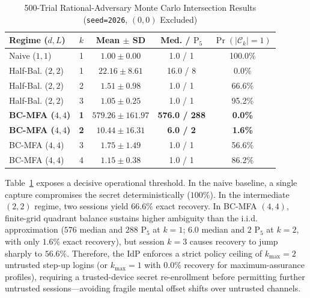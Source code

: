 \begin{table}[!t]
\caption{500-Trial Rational-Adversary Monte Carlo Intersection Results (\texttt{seed=2026}, $(0,0)$ Excluded)}
\label{tab:mc_results}
\centering
\scriptsize
\setlength{\tabcolsep}{3.5pt}
\begin{tabular}{@{}lcccc@{}}
\toprule
\textbf{Regime ($d, L$)} & \textbf{$k$} & \textbf{Mean $\pm$ SD} & \textbf{Med. / $\text{P}_5$} & \textbf{$\Pr(|\mathcal{C}_k|{=}1)$} \\
\midrule
Naive ($1, 1$) & 1 & $1.00 \pm 0.00$ & 1.0 / 1 & 100.0\% \\
\midrule
Half-Bal. ($2, 2$) & 1 & $22.16 \pm 8.61$ & 16.0 / 8 & 0.0\% \\
Half-Bal. ($2, 2$) & 2 & $1.51 \pm 0.98$ & 1.0 / 1 & 66.6\% \\
Half-Bal. ($2, 2$) & 3 & $1.05 \pm 0.25$ & 1.0 / 1 & 95.2\% \\
\midrule
\textbf{BC-MFA ($4, 4$)} & \textbf{1} & \textbf{$579.26 \pm 161.97$} & \textbf{576.0 / 288} & \textbf{0.0\%} \\
\textbf{BC-MFA ($4, 4$)} & \textbf{2} & \textbf{$10.44 \pm 16.31$} & \textbf{6.0 / 2} & \textbf{1.6\%} \\
BC-MFA ($4, 4$) & 3 & $1.75 \pm 1.49$ & 1.0 / 1 & 56.6\% \\
BC-MFA ($4, 4$) & 4 & $1.15 \pm 0.38$ & 1.0 / 1 & 86.2\% \\
\bottomrule
\end{tabular}
\end{table}

Table~\ref{tab:mc_results} exposes a decisive operational threshold. In the naive baseline, a single capture compromises the secret deterministically ($100\%$). In the intermediate $(2, 2)$ regime, two sessions yield $66.6\%$ exact recovery. In BC-MFA $(4, 4)$, finite-grid quadrant balance sustains higher ambiguity than the i.i.d. approximation ($576$ median and $288$ $\text{P}_5$ at $k = 1$; $6.0$ median and $2$ $\text{P}_5$ at $k = 2$, with only $1.6\%$ exact recovery), but session $k = 3$ causes recovery to jump sharply to $56.6\%$. Therefore, the IdP enforces a strict policy ceiling of $k_{\max} = 2$ untrusted step-up logins (or $k_{\max} = 1$ with $0.0\%$ recovery for maximum-assurance profiles), requiring a trusted-device secret re-enrollment before permitting further untrusted sessions—avoiding fragile mental offset shifts over untrusted channels.

